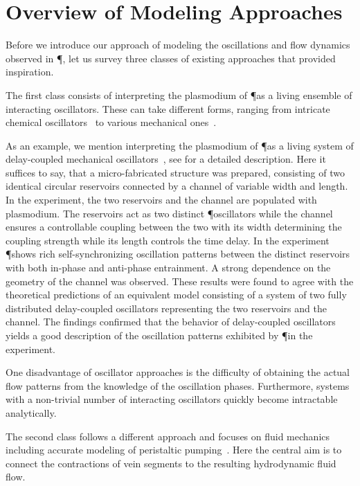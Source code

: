 
\section{Overview of Modeling Approaches}\label{sec:model}

  Before we introduce our approach of modeling the oscillations and flow dynamics observed in \P, let us survey three classes of existing approaches that provided inspiration. 

  The first class consists of interpreting the plasmodium of \P as a living ensemble of interacting oscillators. These can take different forms, ranging from intricate chemical oscillators~\cite{Smith1992368} to various mechanical ones~\cite{PhysRevLett.85.2026,tero2005coupled,takamatsu2001spatiotemporal}. 

  As an example, we mention interpreting the plasmodium of \P as a living system of delay-coupled mechanical oscillators~\cite{PhysRevLett.85.2026}, see  for a detailed description. Here it suffices to say, that a micro-fabricated structure was prepared, consisting of two identical circular reservoirs connected by a channel of variable width and length. In the experiment, the two reservoirs and the channel are populated with plasmodium. The reservoirs act as two distinct \P oscillators while the channel ensures a controllable coupling between the two with its width determining the coupling strength while its length controls the time delay. In the experiment \P shows rich self-synchronizing oscillation patterns between the distinct reservoirs with both in-phase and anti-phase entrainment. A strong dependence on the geometry of the channel was observed. These results were found to agree with the theoretical predictions of an equivalent model consisting of a system of two fully distributed delay-coupled oscillators representing the two reservoirs and the channel. The findings confirmed that the behavior of delay-coupled oscillators yields a good description of the oscillation patterns exhibited by \P in the experiment.

  One disadvantage of oscillator approaches is the difficulty of obtaining the actual flow patterns from the knowledge of the oscillation phases. Furthermore, systems with a non-trivial number of interacting oscillators quickly become intractable analytically.

  The second class follows a different approach and focuses on fluid mechanics including accurate modeling of peristaltic pumping~\cite{alim2013random,teplov1991continuum}. Here the central aim is to connect the contractions of vein segments to the resulting hydrodynamic fluid flow.

